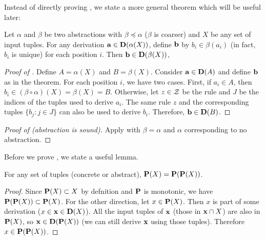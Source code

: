 \appendix
{}

Instead of directly proving , we state a more general
theorem which will be useful later:

\begin{theorem}[Soundness]
\label{thm:soundness}
Let $\alpha$ and $\beta$ be two abstractions with $\beta \preceq \alpha$ ($\beta$ is coarser)
and $X$ be any set of input tuples.
For any derivation $\mathbf{a} \in \mathbf{D}(\alpha(X))$,
define $\mathbf{b}$ by
$b_i \in \beta(a_i)$ (in fact, $b_i$ is unique) for each position $i$.
Then $\mathbf{b} \in \mathbf{D}(\beta(X))$,
\end{theorem}
\begin{proof}[Proof of ]
Define $A=\alpha(X)$ and $B=\beta(X)$.
Consider $\mathbf{a} \in \mathbf{D}(A)$ and define $\mathbf{b}$ as in the theorem.
For each position $i$,
we have two cases.
First, if $a_i \in A$, then $b_i \in (\beta \circ \alpha)(X) = \beta(X) = B$.
Otherwise, let $z \in \mathcal{Z}$ be the rule and $J$ be the indices of the tuples used to derive $a_i$.
The same rule $z$ and the corresponding tuples $\{ b_j : j \in J \}$ can also be used to derive $b_i$.
Therefore, $\mathbf{b} \in \mathbf{D}(B)$.
\end{proof}

\begin{proof}[Proof of  (abstraction is sound)]
Apply  with $\beta = \alpha$ and $\alpha$ corresponding to no
abstraction.
\end{proof}


Before we prove , we state a useful lemma.
\begin{lemma}
\label{lem:Pidem}
For any set of tuples (concrete or abstract), $\mathbf{P}(X) = \mathbf{P}(\mathbf{P}(X))$.
\end{lemma}
\begin{proof}[Proof]
Since $\mathbf{P}(X) \subset X$ by defnition and $\mathbf{P}$ is monotonic,
we have $\mathbf{P}(\mathbf{P}(X)) \subset \mathbf{P}(X)$.
For the other direction, let $x \in \mathbf{P}(X)$.
Then $x$ is part of some derivation ($x \in \mathbf{x} \in \mathbf{D}(X)$).
All the input tuples of $\mathbf{x}$ (those in $\mathbf{x}\cap X$) are also in $\mathbf{P}(X)$,
so $\mathbf{x} \in \mathbf{D}(\mathbf{P}(X))$ (we can still derive $\mathbf{x}$ using those tuples).
Therefore $x \in \mathbf{P}(\mathbf{P}(X))$.
\end{proof}

